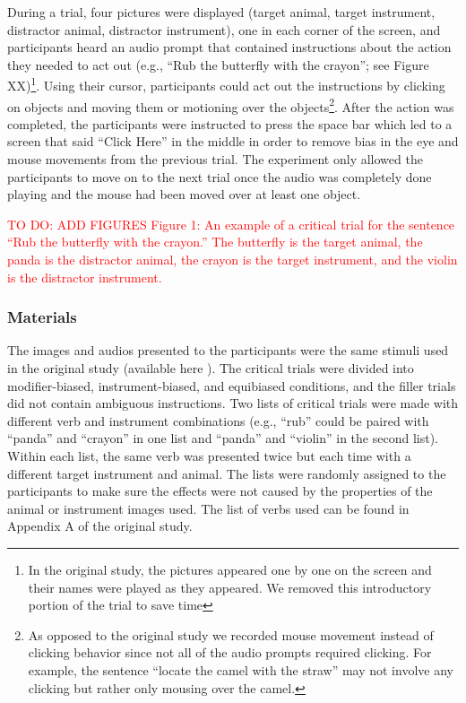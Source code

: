 \documentclass[
  man,floatsintext]{apa6}
\begin{document}
During a trial, four pictures were displayed (target animal, target instrument, distractor animal, distractor instrument), one in each corner of the screen, and participants heard an audio prompt that contained instructions about the action they needed to act out (e.g., ``Rub the butterfly with the crayon''; see Figure XX)\footnote{In the original study, the pictures appeared one by one on the screen and their names were played as they appeared. We removed this introductory portion of the trial to save time}. Using their cursor, participants could act out the instructions by clicking on objects and moving them or motioning over the objects\footnote{ As opposed to the original study we recorded mouse movement instead of clicking behavior since not all of the audio prompts required clicking. For example, the sentence ``locate the camel with the straw'' may not involve any clicking but rather only mousing over the camel.}. After the action was completed, the participants were instructed to press the space bar which led to a screen that said ``Click Here'' in the middle in order to remove bias in the eye and mouse movements from the previous trial. The experiment only allowed the participants to move on to the next trial once the audio was completely done playing and the mouse had been moved over at least one object.

\textcolor{red}{TO DO: ADD FIGURES Figure 1: An example of a critical trial for the sentence “Rub the butterfly with the crayon.” The butterfly is the target animal, the panda is the distractor animal, the crayon is the target instrument, and the violin is the distractor instrument.}

\hypertarget{materials-1}{%
\subsubsection{Materials}\label{materials-1}}

The images and audios presented to the participants were the same stimuli used in the original study (available here ). The critical trials were divided into modifier-biased, instrument-biased, and equibiased conditions, and the filler trials did not contain ambiguous instructions. Two lists of critical trials were made with different verb and instrument combinations (e.g., ``rub'' could be paired with ``panda'' and ``crayon'' in one list and ``panda'' and ``violin'' in the second list). Within each list, the same verb was presented twice but each time with a different target instrument and animal. The lists were randomly assigned to the participants to make sure the effects were not caused by the properties of the animal or instrument images used. The list of verbs used can be found in Appendix A of the original study.
\end{document}
